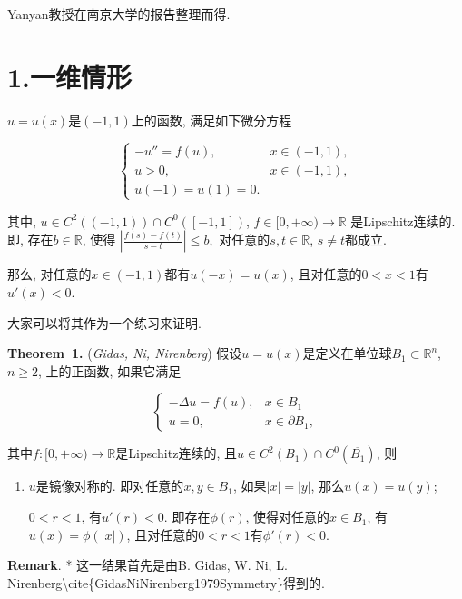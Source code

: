 \documentclass[10pt]{amsart}
\begin{document}
\mdxtitleblockstart{}
\mdxauthorstart{}
\mdxauthorend\mdtitleauthorrunning{}{}\mdxtitleblockend%

 Yanyan教授在南京大学的报告整理而得.%

\section{1.\hspace*{0.5em}一维情形}\label{section}%

$u=u(x)$是$(-1,1)$上的函数, 满足如下微分方程%

\[\begin{cases}
-u''=f(u),&x\in(-1,1),\\
u>0,& x\in(-1,1),\\
u(-1)=u(1)=0.
\end{cases}
\]%

其中, $u\in C^2((-1,1))\cap C^0([-1,1])$, $f\in [0,+\infty)\to \mathbb{R}$ 是Lipschitz连续的. 即, 存在$b\in\mathbb{R}$, 使得
$\left\lvert \frac{f(s)-f(t)}{s-t}\right\rvert\leq b,$
对任意的$s,t\in\mathbb{R}$, $s\neq t$都成立.%

那么, 对任意的$x\in(-1,1)$都有$u(-x)=u(x)$, 且对任意的$0<x<1$有$u'(x)<0$.%

大家可以将其作为一个练习来证明.%

\begin{mdbmarginx}{1ex}{0pt}{1ex}{0pt}%
\noindent\textbf{Theorem~1.} ({\itshape Gidas, Ni, Nirenberg})\mdbr
 假设$u=u(x)$是定义在单位球$B_1\subset \mathbb{R}^n$, $n\geq 2$, 上的正函数, 如果它满足%

\[\begin{cases}
-\Delta u=f(u),&x\in B_1\\
u=0,&x\in\partial B_1,
\end{cases}
\]%

其中$f: [0,+\infty)\to\mathbb{R}$是Lipschitz连续的, 且$u\in C^2(B_1)\cap C^0(\overline{B_1})$, 则%

\begin{enumerate}[noitemsep,topsep=\mdcompacttopsep]%

\item$u$是镜像对称的. 即对任意的$x,y\in B_1$, 如果$|x|=|y|$, 那么$u(x)=u(y)$;%

$0<r<1$, 有$u'(r)<0$. 即存在$\phi(r)$, 使得对任意的$x\in B_1$, 有$u(x)=\phi(|x|)$, 且对任意的$0<r<1$有$\phi'(r)<0$.%
\end{enumerate}%
\end{mdbmarginx}%

\noindent\textbf{Remark}.
  * 这一结果首先是由B. Gidas, W. Ni, L. Nirenberg\textbackslash{}cite\{GidasNiNirenberg1979Symmetry\}得到的.%

\noindent[bib]%
\end{document}
